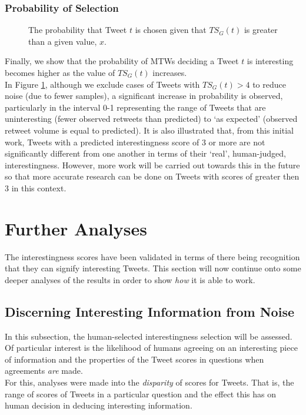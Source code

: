 \subsubsection{Probability of Selection}

\begin{figure}[h]
\caption{The probability that Tweet $t$ is chosen given that $TS_G(t)$ is greater than a given value, $x$.}
\label{fig:score-cum-dist}
\end{figure}

Finally, we show that the probability of MTWs deciding a Tweet $t$ is interesting becomes higher as the value of $TS_G(t)$ increases. \\
In Figure \ref{fig:score-cum-dist}, although we exclude cases of Tweets with $TS_G(t) > 4$ to reduce noise (due to fewer samples), a significant increase in probability is observed, particularly in the interval 0-1 representing the range of Tweets that are uninteresting (fewer observed retweets than predicted) to `as expected' (observed retweet volume is equal to predicted). It is also illustrated that, from this initial work, Tweets with a predicted interestingness score of 3 or more are not significantly different from one another in terms of their `real', human-judged, interestingness. However, more work will be carried out towards this in the future so that more accurate research can be done on Tweets with scores of greater then 3 in this context.


\section{Further Analyses}
The interestingness scores have been validated in terms of there being recognition that they can signify interesting Tweets. This section will now continue onto some deeper analyses of the results in order to show \textit{how} it is able to work.

\subsection{Discerning Interesting Information from Noise}
In this subsection, the human-selected interestingness selection will be assessed. Of particular interest is the likelihood of humans agreeing on an interesting piece of information and the properties of the Tweet scores in questions when agreements \textit{are} made. \\
For this, analyses were made into the \textit{disparity} of scores for Tweets. That is, the range of scores of Tweets in a particular question and the effect this has on human decision in deducing interesting information.

